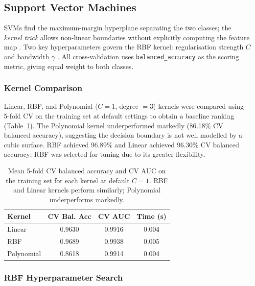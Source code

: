 \documentclass[twocolumn, fontsize=10pt]{article}
\begin{document}
\subsection{Support Vector Machines}
\label{sec:svm}

SVMs find the maximum-margin hyperplane separating the two classes; the
\emph{kernel trick} allows non-linear boundaries without explicitly computing
the feature map \citep{hastie2009elements}. Two key hyperparameters govern the
RBF kernel: regularisation strength $C$ and bandwidth $\gamma$
\citep{james2021statistical}. All cross-validation uses \texttt{balanced\_accuracy}
as the scoring metric, giving equal weight to both classes.

\subsubsection{Kernel Comparison}

Linear, RBF, and Polynomial ($C = 1$, degree $= 3$) kernels were compared using 5-fold CV on the training set at default settings to obtain a baseline ranking (Table~\ref{tab:svm_kernels}). The Polynomial kernel underperformed markedly
(86.18\% CV balanced accuracy), suggesting the decision boundary is not well modelled by a
cubic surface. RBF achieved 96.89\% and Linear achieved 96.30\% CV balanced accuracy; RBF was selected for
tuning due to its greater flexibility.

\begin{table}[H]
\centering
\small
\setlength{\tabcolsep}{3pt}
\begin{tabular}{lccc}
\toprule
\textbf{Kernel} & \textbf{CV Bal. Acc} & \textbf{CV AUC} & \textbf{Time (s)} \\
\midrule
Linear          & 0.9630 & 0.9916 & 0.004 \\
RBF             & 0.9689 & 0.9938 & 0.005 \\
Polynomial      & 0.8618 & 0.9914 & 0.004 \\
\bottomrule
\end{tabular}
\caption{Mean 5-fold CV balanced accuracy and CV AUC on the training set for each kernel at default $C = 1$. RBF and Linear kernels perform similarly; Polynomial underperforms markedly.}
\label{tab:svm_kernels}
\end{table}

\subsubsection{RBF Hyperparameter Search}
\end{document}

